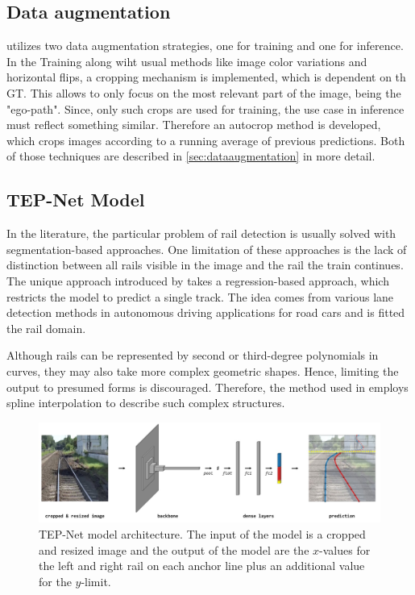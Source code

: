 \subsection{Data augmentation}

\cite{tepNet2024} utilizes two data augmentation strategies, one for training and one for inference.
In the Training along wiht usual methods like image color variations and horizontal flips, a cropping mechanism is implemented, which is dependent on th \ac{GT}.
This allows to only focus on the most relevant part of the image, being the "ego-path".
Since, only such crops are used for training, the use case in inference must reflect something similar.
Therefore an autocrop method is developed, which crops images according to a running average of previous predictions.
Both of those techniques are described in \autoref{sec:dataaugmentation} in more detail.


\subsection{TEP-Net Model}

In the literature, the particular problem of rail detection is usually solved with segmentation-based approaches.
One limitation of these approaches is the lack of distinction between all rails visible in the image and the rail the train continues.
The unique approach introduced by \cite{tepNet2024} takes a regression-based approach, which restricts the model to predict a single track.
The idea comes from various lane detection methods in autonomous driving applications for road cars and is fitted the rail domain.

Although rails can be represented by second or third-degree polynomials in curves, they may also take more complex geometric shapes.
Hence, limiting the output to presumed forms is discouraged.
Therefore, the method used in \cite{tepNet2024} employs spline interpolation to describe such complex structures.

\begin{figure}[H]
    \centering
    \includegraphics[width=\linewidth]{PICs/Baselinepaper/TEP-Net_model.jpg}
    \caption{\ac{TEP}-Net model architecture\cite{tepNet2024}. The input of the model is a cropped and resized image and the output of the model are the $x$-values for the left and right rail on each anchor line plus an additional value for the $y$-limit.}
    \label{fig:TEP-Net_model}
\end{figure}

